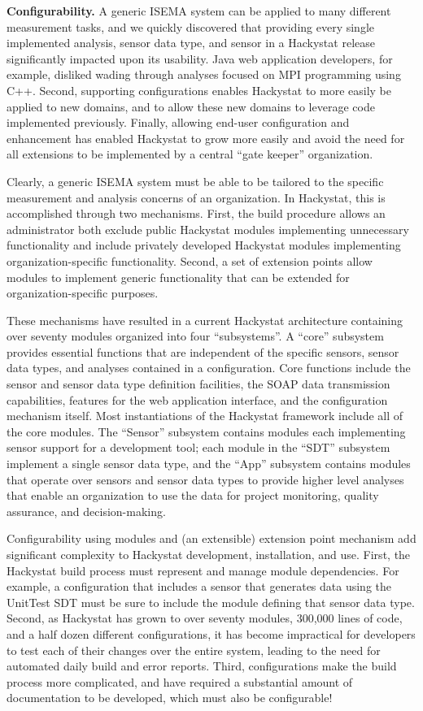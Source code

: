 \documentclass[10pt,twocolumn]{article}
\begin{document}
{\bf Configurability.} A generic ISEMA system can be applied to many
different measurement tasks, and we quickly discovered that providing every
single implemented analysis, sensor data type, and sensor in a Hackystat
release significantly impacted upon its usability.  Java web application
developers, for example, disliked wading through analyses focused on MPI
programming using C++. Second, supporting configurations enables Hackystat
to more easily be applied to new domains, and to allow these new domains to
leverage code implemented previously. Finally, allowing end-user
configuration and enhancement has enabled Hackystat to grow more easily and
avoid the need for all extensions to be implemented by a central ``gate
keeper'' organization.

Clearly, a generic ISEMA system must be able to be tailored to the specific
measurement and analysis concerns of an organization. In Hackystat, this is
accomplished through two mechanisms. First, the build procedure allows an
administrator both exclude public Hackystat modules implementing
unnecessary functionality and include privately developed Hackystat modules
implementing organization-specific functionality. Second, a set of
extension points allow modules to implement generic functionality that can
be extended for organization-specific purposes.  

These mechanisms have resulted in a current Hackystat architecture
containing over seventy modules organized into four ``subsystems''.  A
``core'' subsystem provides essential functions that are independent of the
specific sensors, sensor data types, and analyses contained in a
configuration.  Core functions include the sensor and sensor data type
definition facilities, the SOAP data transmission capabilities, features
for the web application interface, and the configuration mechanism itself.
Most instantiations of the Hackystat framework include all of the core
modules. The ``Sensor'' subsystem contains modules each implementing sensor
support for a development tool; each module in the ``SDT'' subsystem
implement a single sensor data type, and the ``App'' subsystem contains
modules that operate over sensors and sensor data types to provide higher
level analyses that enable an organization to use the data for project
monitoring, quality assurance, and decision-making.

Configurability using modules and (an extensible) extension point mechanism
add significant complexity to Hackystat development, installation, and use.
First, the Hackystat build process must represent and manage module
dependencies. For example, a configuration that includes a sensor that
generates data using the UnitTest SDT must be sure to include the module
defining that sensor data type.  Second, as Hackystat has grown to over
seventy modules, 300,000 lines of code, and a half dozen different
configurations, it has become impractical for developers to test each of
their changes over the entire system, leading to the need for automated
daily build and error reports.  Third, configurations make the build
process more complicated, and have required a substantial amount of
documentation to be developed, which must also be configurable!
\end{document}
